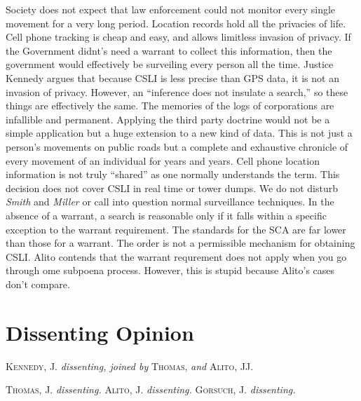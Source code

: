\documentclass[paper=letter,fontsize=10pt]{article}
\begin{document}
	Society does not expect that law enforcement could not monitor every single movement for a very long period.
	Location records hold all the privacies of life.
	Cell phone tracking is cheap and easy, and allows limitless invasion of privacy.
	If the Government didnt’s need a warrant to collect this information, then the government would effectively be surveiling every person all the time.
	Justice Kennedy argues that because CSLI is less precise than GPS data, it is not an invasion of privacy.
	However, an “inference does not insulate a search,” so these things are effectively the same.
	The memories of the logs of corporations are infallible and permanent.
	Applying the third party doctrine would not be a simple application but a huge extension to a new kind of data.
	This is not just a person’s movements on public roads but a complete and exhaustive chronicle of every movement of an individual for years and years.
	Cell phone location information is not truly “shared” as one normally understands the term.
	This decision does not cover CSLI in real time or tower dumps.
	We do not disturb \textit{Smith} and \textit{Miller} or call into question normal surveillance techniques.
	In the absence of a warrant, a search is reasonable only if it falls within a specific exception to the warrant requirement.
	The standards for the SCA are far lower than those for a warrant.
	The order is not a permissible mechanism for obtaining CSLI.
	Alito contends that the warrant requrement does not apply when you go through ome subpoena process.
	However, this is stupid because Alito’s cases don’t compare.


\section{Dissenting Opinion}
	\noindent \textsc{Kennedy, J.} \textit{dissenting, joined by} \textsc{Thomas}, \textit{and} \textsc{Alito, JJ.} \par
	\noindent \textsc{Thomas, J.} \textit{dissenting.}
	\noindent \textsc{Alito, J.} \textit{dissenting.}
	\noindent \textsc{Gorsuch, J.} \textit{dissenting.}
\end{document}
